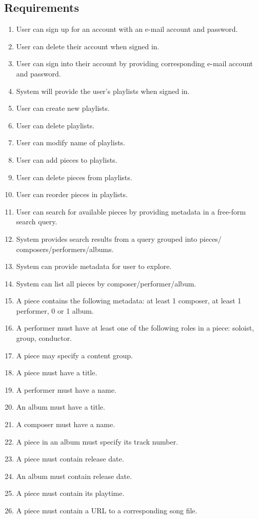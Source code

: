 
\subsection{Requirements}
\label{project-description-req}

\begin{enumerate}
    \item User can sign up for an account with an e-mail account and password.
    \item User can delete their account when signed in.
    \item User can sign into their account by providing corresponding e-mail
        account and password.
    \item System will provide the user's playlists when signed in.
    \item User can create new playlists.
    \item User can delete playlists.
    \item User can modify name of playlists.
    \item User can add pieces to playlists.
    \item User can delete pieces from playlists.
    \item User can reorder pieces in playlists.
    \item User can search for available pieces by providing metadata in a
        free-form search query.
    \item System provides search results from a query grouped into pieces/
        composers/performers/albums.
    \item System can provide metadata for user to explore.
    \item System can list all pieces by composer/performer/album.
    \item A piece contains the following metadata: at least 1 composer,
        at least 1 performer, 0 or 1 album.
    \item A performer must have at least one of the following roles in a piece:
        soloist, group, conductor.
    \item A piece may specify a content group.
    \item A piece must have a title.
    \item A performer must have a name. 
    \item An album must have a title.
    \item A composer must have a name.
    \item A piece in an album must specify its track number. %
    \item A piece must contain release date.
    \item An album must contain release date.
    \item A piece must contain its playtime.
    \item A piece must contain a URL to a corresponding song file.
\end{enumerate}
